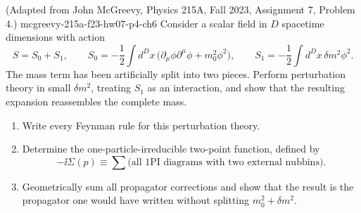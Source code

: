 \begin{enumerate}
  {(Adapted from John McGreevy, Physics 215A, Fall 2023, Assignment 7,
  Problem 4.)}
  {mcgreevy-215a-f23-hw07-p4-ch6}
Consider a scalar field in \(D\) spacetime dimensions with action
\[
 S=S_0+S_1,
 \qquad
 S_0=-\frac12\int d^Dx\,
   \bigl(\partial_\mu\phi\partial^\mu\phi+m_0^2\phi^2\bigr),
 \qquad
 S_1=-\frac12\int d^Dx\,\delta m^2\phi^2.
\]
The mass term has been artificially split into two pieces.  Perform
perturbation theory in small \(\delta m^2\), treating \(S_1\) as an
interaction, and show that the resulting expansion reassembles the complete
mass.
\begin{enumerate}
\item
Write every Feynman rule for this perturbation theory.
\item
Determine the one-particle-irreducible two-point function, defined by
\[
 -\ii\Sigma(p)\equiv
 \sum\bigl(\text{all 1PI diagrams with two external nubbins}\bigr).
\]
\item
Geometrically sum all propagator corrections and show that the result is
the propagator one would have written without splitting
\(m_0^2+\delta m^2\).
\end{enumerate}
\end{enumerate}
